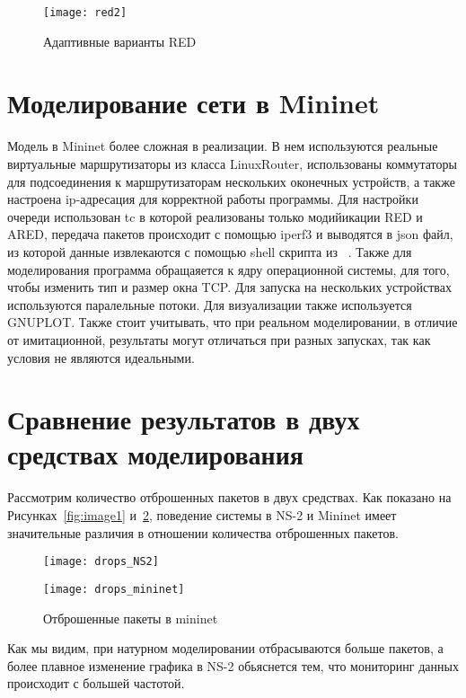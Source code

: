\begin{figure}[h!]
  \centering
  \texttt{[image: red2]}
  \caption{Адаптивные варианты RED}
  \label{ch3:fig4}
\end{figure}



\section{Моделирование сети в Mininet}
\label{chap3:sec2}

Модель в Mininet более сложная в реализации. В нем используются реальные виртуальные маршрутизаторы 
из класса LinuxRouter, использованы коммутаторы для подсоединения к маршрутизаторам нескольких оконечных 
устройств, а также настроена ip-адресация для корректной работы программы. Для настройки очереди использован 
tc в которой реализованы только модийикации RED и ARED, передача пакетов происходит с помощью iperf3 и 
выводятся в json файл, из которой данные извлекаются с помощью shell скрипта из ~\cite{iperf3-plotter}. 
Также для моделирования программа обращаяется к ядру операционной системы, для того, чтобы изменить тип и размер
окна TCP. Для запуска на нескольких устройствах используются паралельные потоки. Для визуализации также используется GNUPLOT.
Также стоит учитывать, что при реальном моделировании, в отличие от имитационной, результаты могут отличаться при разных запусках,
так как условия не являются идеальными.  

\section{Сравнение результатов в двух средствах моделирования}
\label{chap3:sec3}

Рассмотрим количество отброшенных пакетов в двух средствах. Как показано на Рисунках~\ref{fig:image1} и~\ref{fig:image2}, 
поведение системы в NS-2 и Mininet имеет значительные различия в отношении количества отброшенных пакетов.

\begin{figure}[ht]
    \centering
    \begin{minipage}[b]{0.45\textwidth}
        \texttt{[image: drops\_NS2]}
        \caption{Отброшенные пакеты в NS-2}
        \label{fig:image1}
    \end{minipage}
    \begin{minipage}[b]{0.45\textwidth}
        \texttt{[image: drops\_mininet]}
        \caption{Отброшенные пакеты в mininet}
        \label{fig:image2}
    \end{minipage}
\end{figure}

Как мы видим, при натурном моделировании отбрасываются больше пакетов, 
а более плавное изменение графика в NS-2 обьяснется тем, что мониторинг
данных происходит с большей частотой.  



